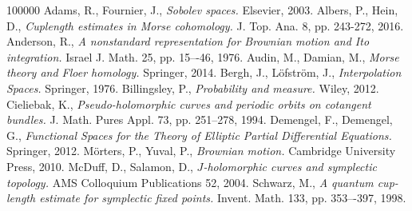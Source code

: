 \documentclass[a4paper,11pt]{amsart}
\begin{document}
\begin{thebibliography}{100000}
 Adams, R., Fournier, J., \emph{Sobolev spaces.} Elsevier, 2003.
 Albers, P., Hein, D., \emph{Cuplength estimates in Morse cohomology.} J. Top. Ana. 8, pp. 243-272, 2016.
 Anderson, R., \emph{A nonstandard representation for Brownian motion and Ito
integration.} Israel J. Math. 25, pp. 15–-46, 1976.
 Audin, M., Damian, M., \emph{Morse theory and Floer homology.} Springer, 2014.
 Bergh, J., L\"ofstr\"om, J., \emph{Interpolation Spaces.} Springer, 1976.
 Billingsley, P., \emph{Probability and measure.} Wiley, 2012. 
 Cieliebak, K., \emph{Pseudo-holomorphic curves and periodic orbits on cotangent bundles.} J. Math. Pures Appl. 73, pp. 251--278, 1994.
 Demengel, F., Demengel, G., \emph{Functional Spaces for the Theory of Elliptic Partial Differential Equations.} Springer, 2012.
 M\"orters, P., Yuval, P., \emph{Brownian motion.} Cambridge University Press, 2010.
 McDuff, D., Salamon, D., \emph{$J$-holomorphic curves and symplectic topology.} AMS Colloquium Publications 52, 2004.
 Schwarz, M., \emph{A quantum cup-length estimate for symplectic fixed points.} Invent. Math. 133, pp. 353–-397, 1998.
\end{thebibliography}
\end{document}
